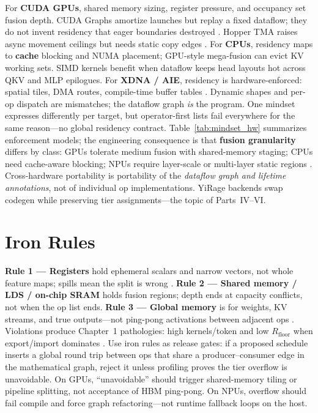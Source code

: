 For \textbf{CUDA GPUs}, shared memory sizing, register pressure, and occupancy set fusion depth.
CUDA Graphs amortize launches but replay a fixed dataflow; they do not invent residency that eager boundaries destroyed \citep{nvidia2024cudagraphs,memoryfloor2026}.
Hopper TMA raises async movement ceilings but needs static copy edges \citep{nvidia2022hopper,semianalysis2024tma}.
For \textbf{CPUs}, residency maps to \textbf{cache} blocking and NUMA placement; GPU-style mega-fusion can evict KV working sets.
SIMD kernels benefit when dataflow keeps head layouts hot across QKV and MLP epilogues.
For \textbf{XDNA / AIE}, residency is hardware-enforced: spatial tiles, DMA routes, compile-time buffer tables \citep{amd2024xdna,amd2024aie}.
Dynamic shapes and per-op dispatch are mismatches; the dataflow graph \emph{is} the program.
One mindset expresses differently per target, but operator-first lists fail everywhere for the same reason---no global residency contract.
Table~\ref{tab:mindset_hw} summarizes enforcement models; the engineering consequence is that \textbf{fusion granularity} differs by class: GPUs tolerate medium fusion with shared-memory staging; CPUs need cache-aware blocking; NPUs require layer-scale or multi-layer static regions \citep{amd2024xdna}.
Cross-hardware portability is portability of the \emph{dataflow graph and lifetime annotations}, not of individual op implementations.
YiRage backends swap codegen while preserving tier assignments---the topic of Parts~IV--VI.

\section{Iron Rules}
\label{sec:iron_rules}

\textbf{Rule 1 --- Registers} hold ephemeral scalars and narrow vectors, not whole feature maps; spills mean the split is wrong \citep{nvidia2022hopper}.
\textbf{Rule 2 --- Shared memory / LDS / on-chip SRAM} holds fusion regions; depth ends at capacity conflicts, not when the op list ends.
\textbf{Rule 3 --- Global memory} is for weights, KV streams, and true outputs---not ping-pong activations between adjacent ops \citep{kwon2023vllm,memoryfloor2026}.
Violations produce Chapter~1 pathologies: high kernels/token and low $R_{\mathrm{floor}}$ when export/import dominates \citep{taxbreak2026,memoryfloor2026}.
Use iron rules as release gates: if a proposed schedule inserts a global round trip between ops that share a producer--consumer edge in the mathematical graph, reject it unless profiling proves the tier overflow is unavoidable.
On GPUs, ``unavoidable'' should trigger shared-memory tiling or pipeline splitting, not acceptance of HBM ping-pong.
On NPUs, overflow should fail compile and force graph refactoring---not runtime fallback loops on the host.


